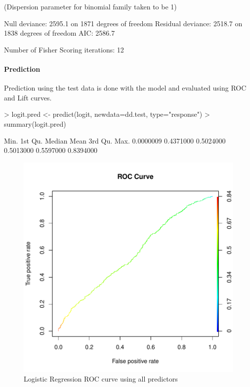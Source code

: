 \documentclass{article}
\begin{document}
\begin{Schunk}
\begin{Soutput}
(Dispersion parameter for binomial family taken to be 1)

    Null deviance: 2595.1  on 1871  degrees of freedom
Residual deviance: 2518.7  on 1838  degrees of freedom
AIC: 2586.7

Number of Fisher Scoring iterations: 12
\end{Soutput}
\end{Schunk}
\paragraph{Prediction}

Prediction using the test data is done with the model and evaluated using ROC and Lift curves. 
\begin{Schunk}
\begin{Sinput}
> logit.pred <- predict(logit, newdata=dd.test, type="response")
> summary(logit.pred)
\end{Sinput}
\begin{Soutput}
     Min.   1st Qu.    Median      Mean   3rd Qu.      Max. 
0.0000009 0.4371000 0.5024000 0.5013000 0.5597000 0.8394000 
\end{Soutput}
\end{Schunk}

\begin{figure}
\begin{center}
\begin{Schunk}
\end{Schunk}
\includegraphics{DirectMailPrediction-006}
\end{center}
\caption{Logistic Regression ROC curve using all predictors}
\label{lr-roc-a}
\end{figure}
\end{document}
